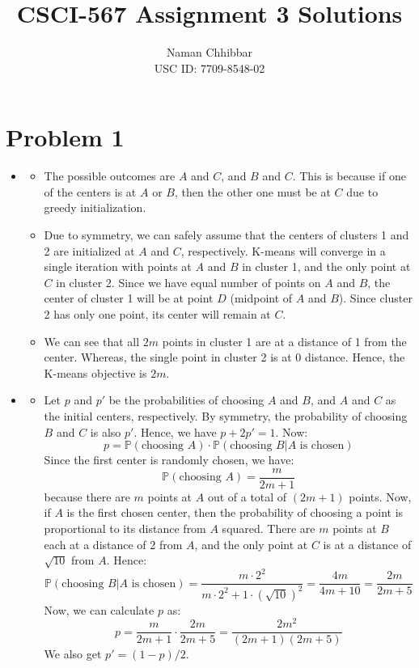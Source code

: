 \documentclass{article}
\title{CSCI-567 Assignment 3 Solutions}
\author{
  Naman Chhibbar \\
  USC ID: 7709-8548-02
}
\date{}
\begin{document}
\maketitle

\section{Problem 1}
  \begin{itemize}
    \item[\textbf{1.1}]
    \begin{itemize}
      \item[(1)] The possible outcomes are $A$ and $C$, and $B$ and $C$.
      This is because if one of the centers is at $A$ or $B$, then the other one must be at $C$ due to greedy initialization.

      \item[(2)] Due to symmetry, we can safely assume that the centers of clusters 1 and 2 are initialized at $A$ and $C$, respectively.
      K-means will converge in a single iteration with points at $A$ and $B$ in cluster 1, and the only point at $C$ in cluster 2.
      Since we have equal number of points on $A$ and $B$, the center of cluster 1 will be at point $D$ (midpoint of $A$ and $B$).
      Since cluster 2 has only one point, its center will remain at $C$.

      \item[(3)] We can see that all $2m$ points in cluster 1 are at a distance of 1 from the center.
      Whereas, the single point in cluster 2 is at 0 distance.
      Hence, the K-means objective is $2m$.
    \end{itemize}

    \item[\textbf{1.2}]
    \begin{itemize}
      \item[(1)] Let $p$ and $p'$ be the probabilities of choosing $A$ and $B$, and $A$ and $C$ as the initial centers, respectively.
      By symmetry, the probability of choosing $B$ and $C$ is also $p'$.
      Hence, we have $p + 2p' = 1$.
      Now:
      \[ p = \mathbb{P}(\text{choosing }A) \cdot \mathbb{P}(\text{choosing }B | A \text{ is chosen}) \]
      Since the first center is randomly chosen, we have:
      \[ \mathbb{P}(\text{choosing }A) = \frac{m}{2m + 1} \]
      because there are $m$ points at $A$ out of a total of $(2m + 1)$ points.
      Now, if $A$ is the first chosen center, then the probability of choosing a point is proportional to its distance from $A$ squared.
      There are $m$ points at $B$ each at a distance of 2 from $A$, and the only point at $C$ is at a distance of $\sqrt{10}$ from $A$.
      Hence:
      \[ \mathbb{P}(\text{choosing }B | A \text{ is chosen}) = \frac{m \cdot 2^2}{m \cdot 2^2 + 1 \cdot (\sqrt{10})^2} = \frac{4m}{4m + 10} = \frac{2m}{2m + 5} \]
      Now, we can calculate $p$ as:
      \[ p = \frac{m}{2m + 1} \cdot \frac{2m}{2m + 5} = \frac{2m^2}{(2m + 1)(2m + 5)} \]
      We also get $p' = (1-p)/2$.


\end{itemize}
\end{itemize}
\end{document}
